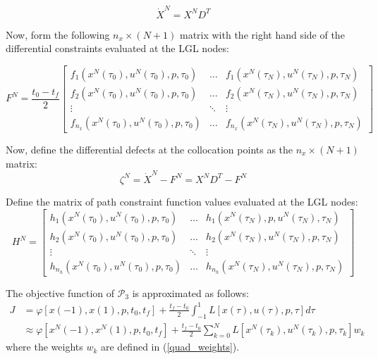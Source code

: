 \documentclass[a4paper,11pt]{report}    %
\begin{document}
\begin{equation}
    \dot X^N = X^N D^T
\end{equation}

Now, form the following $n_x \times (N+1) $ matrix with the right hand side of the differential constraints evaluated
at the LGL nodes:

\begin{equation}
    F^N = \frac{t_0-t_f}{2} \begin{bmatrix} 
           f_1(x^N(\tau_0),u^N(\tau_0),p,\tau_0)&  \ldots& f_{1}(x^N(\tau_N),u^N(\tau_N),p,\tau_N) \\
           f_2(x^N(\tau_0),u^N(\tau_0),p,\tau_0)&  \ldots& f_{2}(x^N(\tau_N),u^N(\tau_N),p,\tau_N)\\
           \vdots    &  \ddots& \vdots \\
           f_{n_x}(x^N(\tau_0),u^N(\tau_0),p,\tau_0)&  \ldots& f_{n_x}(x^N(\tau_N),u^N(\tau_N),p,\tau_N)
         \end{bmatrix}
\end{equation}

Now, define the differential defects at the collocation points as the $n_x\times (N+1)$ matrix:
\begin{equation} \label{differential_defects}
   \zeta^N = \dot X^N - F^N = X^N D^T - F^N
\end{equation}

Define the matrix of path constraint function values evaluated at the LGL nodes:
\begin{equation}
    H^N = \begin{bmatrix} 
           h_1(x^N(\tau_0),u^N(\tau_0),p,\tau_0)&  \ldots& h_{1}(x^N(\tau_N),p,u^N(\tau_N),\tau_N) \\
           h_2(x^N(\tau_0),u^N(\tau_0),p,\tau_0)&  \ldots& h_{2}(x^N(\tau_N),u^N(\tau_N),p,\tau_N)\\
           \vdots  &  \ddots& \vdots \\
           h_{n_h}(x^N(\tau_0),u^N(\tau_0),p,\tau_0)&  \ldots& h_{n_h}(x^N(\tau_N),u^N(\tau_N),p,\tau_N)
         \end{bmatrix}
\end{equation}

The objective function of $\mathcal{P}_3$ is approximated as follows:
\begin{equation}
\begin{aligned}
   J &=  \varphi[ x(-1), x(1), p, t_0, t_f ] + \frac{t_f-t_0}{2} \int_{-1}^{1} L[x(\tau),u(\tau),p, \tau] d\tau \\
     &\approx \varphi[ x^N(-1), x^N(1), p, t_0, t_f ] + \frac{t_f-t_0}{2}\sum\limits_{k=0}^N L[ x^N(\tau_k), u^N(\tau_k),p,\tau_k] w_k
\end{aligned}   
\end{equation}
where the weights $w_k$ are defined in (\ref{quad_weights}).
\end{document}
